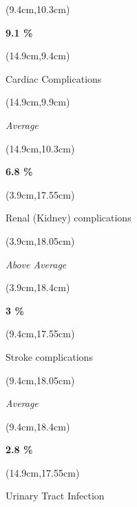\documentclass[
  11pt,
  landscape]{article}
\begin{document}
\begin{textblock*}{5cm}(9.4cm,10.3cm) %
    \centerline{\textbf{9.1 \%}}
\end{textblock*}

\begin{textblock*}{5cm}(14.9cm,9.4cm) %
    \centerline{\small{Cardiac Complications}}
\end{textblock*}

\begin{textblock*}{5cm}(14.9cm,9.9cm) %
    \small \centerline{\textit{Average}}
\end{textblock*}

\begin{textblock*}{5cm}(14.9cm,10.3cm) %
    \centerline{\textbf{6.8 \%}}
\end{textblock*}

\begin{textblock*}{5cm}(3.9cm,17.55cm) %
    \centerline{\small{Renal (Kidney) complications}}
\end{textblock*}

\begin{textblock*}{5cm}(3.9cm,18.05cm) %
    \small \centerline{\textit{Above Average}}
\end{textblock*}

\begin{textblock*}{5cm}(3.9cm,18.4cm) %
    \centerline{\textbf{3 \%}}
\end{textblock*}

\begin{textblock*}{5cm}(9.4cm,17.55cm) %
    \centerline{\small{Stroke complications}}
\end{textblock*}

\begin{textblock*}{5cm}(9.4cm,18.05cm) %
    \small \centerline{\textit{Average}}
\end{textblock*}

\begin{textblock*}{5cm}(9.4cm,18.4cm) %
    \centerline{\textbf{2.8 \%}}
\end{textblock*}

\begin{textblock*}{5cm}(14.9cm,17.55cm) %
    \centerline{\small{Urinary Tract Infection}}
\end{textblock*}
\end{document}
